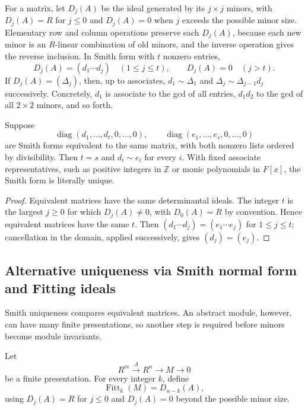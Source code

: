 For a matrix, let \(D_j(A)\) be the ideal generated by its \(j\times j\)
minors, with \(D_j(A)=R\) for \(j\leq0\) and \(D_j(A)=0\) when \(j\)
exceeds the possible minor size. Elementary row and column operations preserve
each \(D_j(A)\), because each new minor is an \(R\)-linear combination of old
minors, and the inverse operation gives the reverse inclusion.  In Smith form
with \(t\) nonzero entries,
\[
D_j(A)=(d_1\cdots d_j)\quad(1\leq j\leq t),
\qquad D_j(A)=0\quad(j>t).
\]
If \(D_j(A)=(\Delta_j)\), then, up to associates,
\(d_1\sim\Delta_1\) and
\(\Delta_j\sim\Delta_{j-1}d_j\) successively. Concretely, \(d_1\) is
associate to the gcd of all entries, \(d_1d_2\) to the gcd of all
\(2\times2\) minors, and so forth.

\begin{corollary}
\label{cor:smith-uniqueness}
Suppose
\[
\operatorname{diag}(d_1,\ldots,d_t,0,\ldots,0),\qquad
\operatorname{diag}(e_1,\ldots,e_s,0,\ldots,0)
\]
are Smith forms equivalent to the same matrix, with both nonzero lists ordered
by divisibility. Then \(t=s\) and \(d_i\sim e_i\) for every \(i\).
With fixed associate representatives, such as positive integers in
\(\mathbb Z\) or monic polynomials in \(F[x]\), the Smith form is literally
unique.
\end{corollary}
\begin{proof}
Equivalent matrices have the same determinantal ideals. The integer \(t\) is
the largest \(j\geq0\) for which \(D_j(A)\ne0\), with \(D_0(A)=R\) by
convention. Hence equivalent matrices have the same \(t\). Then
\((d_1\cdots d_j)=(e_1\cdots e_j)\) for \(1\leq j\leq t\); cancellation in the
domain, applied successively, gives \((d_j)=(e_j)\).
\end{proof}

\subsection*{Alternative uniqueness via Smith normal form and Fitting ideals}
Smith uniqueness compares equivalent matrices. An abstract module, however,
can have many finite presentations, so another step is required before minors
become module invariants.

Let
\[
R^m\xrightarrow{A}R^n\longrightarrow M\longrightarrow0
\]
be a finite presentation. For every integer \(k\), define
\[
\operatorname{Fitt}_k(M)=D_{n-k}(A),
\]
using \(D_j(A)=R\) for \(j\leq0\) and \(D_j(A)=0\) beyond the possible
minor size.

